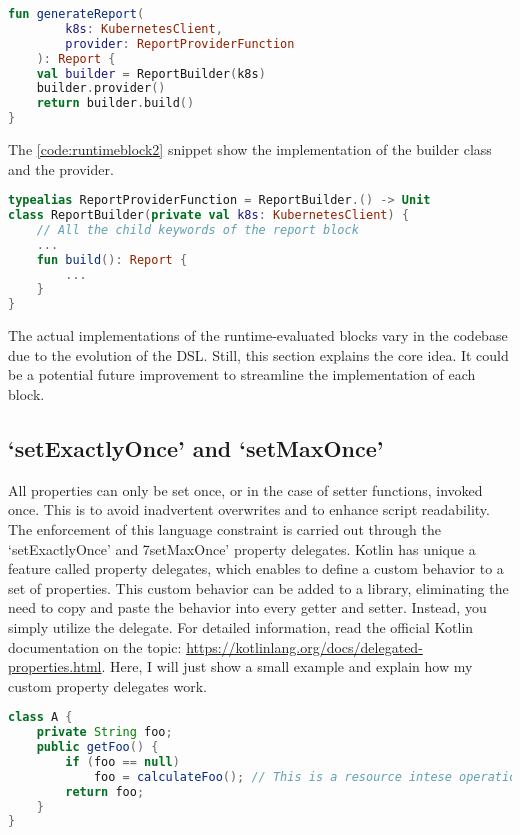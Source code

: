 \begin{lstlisting}[caption={Build a report},language=Kotlin,label=code:runtimeblock1]
fun generateReport(
        k8s: KubernetesClient, 
        provider: ReportProviderFunction
    ): Report {
    val builder = ReportBuilder(k8s)
    builder.provider()
    return builder.build()
}
\end{lstlisting}

The \ref{code:runtimeblock2} snippet show the implementation of the builder class and the provider.

\begin{lstlisting}[caption={Report builder class and provider},language=Kotlin,label=code:runtimeblock2]
typealias ReportProviderFunction = ReportBuilder.() -> Unit
class ReportBuilder(private val k8s: KubernetesClient) {
    // All the child keywords of the report block
    ...
    fun build(): Report {
        ...
    }
}
\end{lstlisting}

The actual implementations of the runtime-evaluated blocks vary in the codebase due to the evolution of the DSL. Still, this section explains the core idea. It could be a potential future improvement to streamline the implementation of each block.

\subsection{`setExactlyOnce' and `setMaxOnce'}

All properties can only be set once, or in the case of setter functions, invoked once. This is to avoid inadvertent overwrites and to enhance script readability. The enforcement of this language constraint is carried out through the `setExactlyOnce' and 7setMaxOnce' property delegates. Kotlin has unique a feature called property delegates, which enables to define a custom behavior to a set of properties. This custom behavior can be added to a library, eliminating the need to copy and paste the behavior into every getter and setter. Instead, you simply utilize the delegate. For detailed information, read the official Kotlin documentation on the topic: \url{https://kotlinlang.org/docs/delegated-properties.html}. Here, I will just show a small example and explain how my custom property delegates work.

\begin{lstlisting}[caption={Lazy getter in Java},language=Java,label=code:lazy0]
class A {
    private String foo;
    public getFoo() {
        if (foo == null) 
            foo = calculateFoo(); // This is a resource intese operation
        return foo;
    }
}
\end{lstlisting}
    
